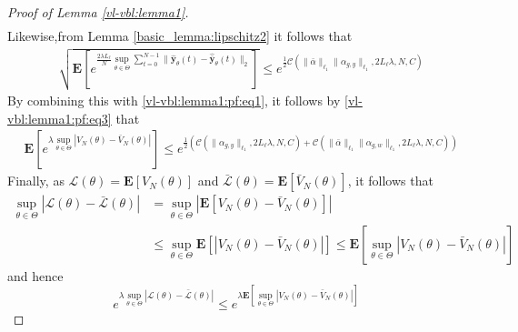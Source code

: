 \documentclass{article}
\def\rve{{\mathbf{e}}}
\def\rvy{{\mathbf{y}}}
\newcommand{\bE}{\mathbf{E}}
\begin{document}
\begin{proof}[Proof of Lemma \ref{vl-vbl:lemma1}]
\begin{align*}
 \end{align*}   
Likewise,from Lemma \ref{basic_lemma:lipschitz2} it follows that 
\begin{align*}
    & \sqrt{\bE[e^{\frac{2 \lambda L_{\ell}}{N} \sup_{\theta \in \Theta}\sum_{t=0}^{N-1} \|\hat{\rvy}_{\theta}(t)-\hat{\bar{\rvy}}_{\theta}(t)\|_2}]} \le  e^{\frac{1}{2} \mathcal{C}(\|\bar{\alpha}\|_{\ell_1} \|\alpha_{g,y}\|_{\ell_1}, 2L_{\ell}\lambda,N,C)} 
\end{align*}
By combining this with \eqref{vl-vbl:lemma1:pf:eq1}, it follows by \eqref{vl-vbl:lemma1:pf:eq3} that 
\begin{equation}
\label{vl-vbl:lemma1:pf:eq4}
\begin{aligned}
& \bE[e^{\lambda \sup_{\theta \in \Theta}|V_N(\theta) - \bar{V}_N(\theta)|}] \le e^{\frac{1}{2} (\mathcal{C}(\|\alpha_{g,y}\|_{\ell_1}, 2L_{\ell}\lambda,N,C) + \mathcal{C}(\|\bar{\alpha}\|_{\ell_1} \|\alpha_{g,w}\|_{\ell_1}, 2L_{\ell}\lambda,N,C))}  
\end{aligned}
\end{equation}
Finally, as $\mathcal{L}(\theta)=\bE[V_N(\theta)]$ 
and $\bar{\mathcal{L}}(\theta)=\bE[\bar{V}_N(\theta)]$, it follows that
\begin{align*}
  \sup_{\theta \in \Theta} |\mathcal{L}(\theta) - \bar{\mathcal{L}}(\theta)| &= 
   \sup_{\theta \in \Theta} |\bE[V_N(\theta) - \bar{V}_N(\theta)]| \\
   &\le \sup_{\theta \in \Theta} \bE[|V_N(\theta) - \bar{V}_N(\theta)|] \le    \bE[\sup_{\theta \in \Theta} |V_N(\theta) - \bar{V}_N(\theta)|]
\end{align*}
and hence
\begin{equation}
  \label{vl-bl:lemma1:pf:eq5}
   e^{\lambda \sup_{\theta \in \Theta} |\mathcal{L}(\theta) - \bar{\mathcal{L}}(\theta)|} \le e^{\lambda \bE[\sup_{\theta \in \Theta} |V_N(\theta) - \bar{V}_N(\theta)|]}

\end{equation}
\end{proof}
\end{document}
